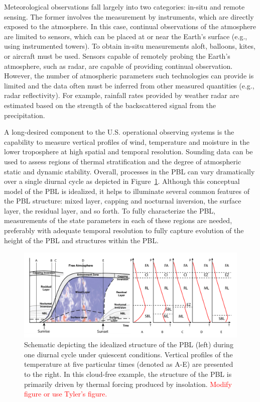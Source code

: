 \documentclass[sensors,review,submit,moreauthors,pdftex,10pt,a4paper]{mdpi}
\theoremstyle{mdpi}
\newcounter{ex}
\newcounter{re}
\theoremstyle{mdpidefinition}
\begin{document}
Meteorological observations fall largely into two categories: in-situ and remote sensing. The former involves the measurement by instruments, which are directly exposed to the atmosphere. In this case, continual observations of the atmosphere are limited to sensors, which can be placed at or near the Earth's surface (e.g., using instrumented towers). To obtain in-situ measurements aloft, balloons, kites, or aircraft must be used. Sensors capable of remotely probing the Earth's atmosphere, such as radar, are capable of providing continual observation. However, the number of atmospheric parameters such technologies can provide is limited and the data often must be inferred from other measured quantities (e.g., radar reflectivity).  For example, rainfall rates provided by weather radar are estimated based on the strength of the backscattered signal from the precipitation.

A long-desired component to the U.S. operational observing systems is the capability to measure vertical profiles of wind, temperature and moisture in the lower troposphere at high spatial and temporal resolution. Sounding data can be used to assess regions of thermal stratification and the degree of atmospheric static and dynamic stability. Overall, processes in the PBL can vary dramatically over a single diurnal cycle as depicted in Figure~\ref{fig:ABLCartoon}. Although this conceptual model of the PBL is idealized, it helps to illuminate several common features of the PBL structure: mixed layer, capping and nocturnal inversion, the surface layer, the residual layer, and so forth. To fully characterize the PBL, measurements of the state parameters in each of these regions are needed, preferably with adequate temporal resolution to fully capture evolution of the height of the PBL and structures within the PBL.

\begin{figure}
\centering
\includegraphics[angle=0, width=\textwidth]{figures/ABL_profiles_cartoon.pdf}
\caption{\label{fig:ABLCartoon} Schematic depicting the idealized structure of the PBL (left) during one diurnal cycle under quiescent conditions. Vertical profiles of the temperature at five particular times (denoted as A-E) are presented to the right. In this cloud-free example, the structure of the PBL is primarily driven by thermal forcing produced by insolation. \textcolor{red}{Modify figure or use Tyler's figure.}}
\end{figure}
\end{document}
